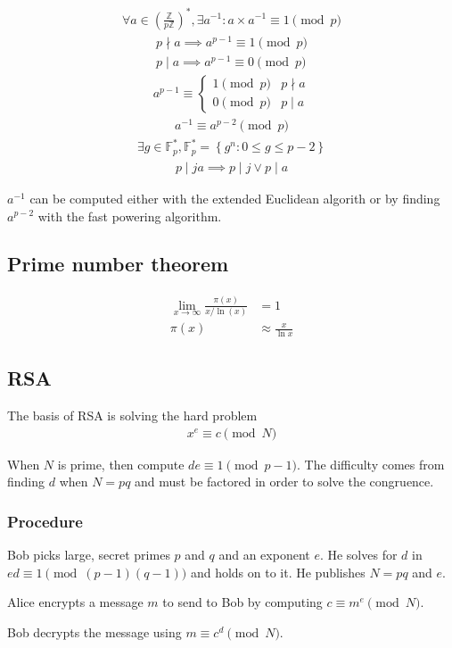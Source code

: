 \documentclass{article}
\newcommand{\curly}[1]{\left\{ #1 \right\}}
\newcommand{\soft}[1]{\left( #1 \right)}
\begin{document}
\begin{multicols*}{2}
\begin{align*}
    \forall a \in \soft{\frac{\mathbb{Z}}{p\mathbb{Z}}}^*, \exists a^{-1} : a \times a^{-1} \equiv 1 \pmod{p}
\end{align*}
\begin{align*}
    p \nmid a \implies a^{p-1} \equiv 1 \pmod{p} \\
    p  \mid a \implies a^{p-1} \equiv 0 \pmod{p}
\end{align*}
\begin{align*}
    a^{p-1} \equiv \begin{cases}
        1 \pmod{p} & p \nmid a \\
        0 \pmod{p} & p  \mid a
    \end{cases}
\end{align*}
\begin{align*}
    a^{-1} \equiv a^{p-2} \pmod{p}
\end{align*}
\begin{align*}
    \exists g \in \mathbb{F}_p^* , \mathbb{F}_p^* = \curly{g^n : 0 \leq g \leq p - 2}
\end{align*}
\begin{align*}
    p \mid ja \implies p \mid j \vee p \mid a
\end{align*}

$a^{-1}$ can be computed either with the extended Euclidean algorith or by finding $a^{p-2}$ with the fast powering algorithm.

\subsection*{Prime number theorem}
\begin{align*}
    \lim_{x \rightarrow \infty} \frac{\pi(x)}{x / \ln(x)} &= 1 \\
    \pi(x) &\approx \frac{x}{\ln x}
\end{align*}

\subsection*{RSA}
The basis of RSA is solving the hard problem
\begin{align*}
    x^e \equiv c \pmod{N}
\end{align*}

When $N$ is prime, then compute $de \equiv 1 \pmod{p-1}$. The difficulty comes from finding $d$ when $N = pq$ and must be factored in order to solve the congruence.

\subsubsection*{Procedure}
Bob picks large, secret primes $p$ and $q$ and an exponent $e$. He solves for $d$ in $ed \equiv 1 \pmod{(p-1)(q-1)}$ and holds on to it. He publishes $N = pq$ and $e$.

Alice encrypts a message $m$ to send to Bob by computing $c \equiv m^e \pmod{N}$.

Bob decrypts the message using $m \equiv c^d \pmod{N}$.

\end{multicols*}
\end{document}
